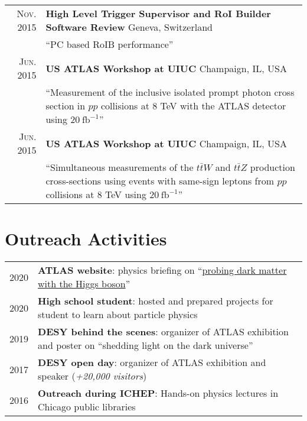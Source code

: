 \documentclass[a4paper,10pt]{article}
\begin{document}
\begin{tabular}{rp{15.5cm}}
\textsc{Nov. 2015}		& {\bf High Level Trigger Supervisor and RoI Builder Software Review} \hfill Geneva, Switzerland\\
						& ``PC based RoIB performance''  	\\
\textsc{Jun. 2015}		& {\bf US ATLAS Workshop at UIUC} \hfill Champaign, IL, USA\\
						& ``Measurement of the inclusive isolated prompt photon cross section in $pp$ collisions at 8 TeV with the ATLAS detector using $20\ \mathrm{fb}^{-1}$''  	\\
\textsc{Jun. 2015}		& {\bf US ATLAS Workshop at UIUC} \hfill Champaign, IL, USA\\
						& ``Simultaneous measurements of the $t\bar{t}W$ and $t\bar{t}Z$ production cross-sections using events with same-sign leptons from $pp$ collisions at 8 TeV using $20\ \mathrm{fb}^{-1}$''  	\\
\end{tabular}

\vspace{3mm}
\section{Outreach Activities}

\begin{tabular}{rp{15.5cm}}
\textsc{2020}		& {\bf ATLAS website}: physics briefing on ``\href{http://atlas.cern/updates/physics-briefing/probing-dark-matter-higgs-boson}{probing dark matter with the Higgs boson}'' \\
\textsc{2020}		& {\bf High school student}: hosted and prepared projects for student to learn about particle physics\\
\textsc{2019}		& {\bf DESY behind the scenes}: organizer of ATLAS exhibition and poster on ``shedding light on the dark universe'' \\
\textsc{2017}		& {\bf DESY open day}: organizer of ATLAS exhibition and speaker ({\it +20,000 visitors})\\
\textsc{2016}		& {\bf Outreach during ICHEP}: Hands-on physics lectures in Chicago public libraries \\
\end{tabular}
\end{document}
